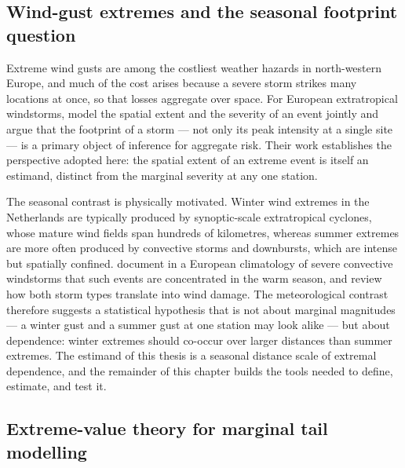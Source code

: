 \subsection{Wind-gust extremes and the seasonal footprint question}\label{sec:lit-wind}

Extreme wind gusts are among the costliest weather hazards in north-western Europe, and much of the cost arises because a severe storm strikes many locations at once, so that losses aggregate over space. For European extratropical windstorms, \citet{sharkey2020} model the spatial extent and the severity of an event jointly and argue that the footprint of a storm --- not only its peak intensity at a single site --- is a primary object of inference for aggregate risk. Their work establishes the perspective adopted here: the spatial extent of an extreme event is itself an estimand, distinct from the marginal severity at any one station.

The seasonal contrast is physically motivated. Winter wind extremes in the Netherlands are typically produced by synoptic-scale extratropical cyclones, whose mature wind fields span hundreds of kilometres, whereas summer extremes are more often produced by convective storms and downbursts, which are intense but spatially confined. \citet{pacey2021} document in a European climatology of severe convective windstorms that such events are concentrated in the warm season, and \citet{gliksman2023european} review how both storm types translate into wind damage. The meteorological contrast therefore suggests a statistical hypothesis that is not about marginal magnitudes --- a winter gust and a summer gust at one station may look alike --- but about dependence: winter extremes should co-occur over larger distances than summer extremes. The estimand of this thesis is a seasonal distance scale of extremal dependence, and the remainder of this chapter builds the tools needed to define, estimate, and test it.

\subsection{Extreme-value theory for marginal tail modelling}\label{sec:lit-evt}

